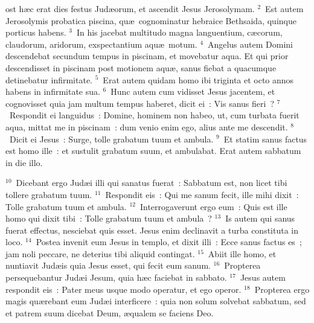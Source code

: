 \bchapter
{}ost h\ae c erat dies festus Jud\ae orum, et ascendit Jesus Jerosolymam.
${}^{2}$~Est autem Jerosolymis probatica piscina, qu\ae\ cognominatur hebraice Bethsaida, quinque porticus habens.
${}^{3}$~In his jacebat multitudo magna languentium, c\ae corum, claudorum, aridorum, exspectantium aqu\ae\ motum.
${}^{4}$~Angelus autem Domini descendebat secundum tempus in piscinam, et movebatur aqua. Et qui prior descendisset in piscinam post motionem aqu\ae , sanus fiebat a quacumque detinebatur infirmitate.
${}^{5}$~Erat autem quidam homo ibi triginta et octo annos habens in infirmitate sua.
${}^{6}$~Hunc autem cum vidisset Jesus jacentem, et cognovisset quia jam multum tempus haberet, dicit ei~: Vis sanus fieri~?
${}^{7}$~Respondit ei languidus~: Domine, hominem non habeo, ut, cum turbata fuerit aqua, mittat me in piscinam~: dum venio enim ego, alius ante me descendit.
${}^{8}$~Dicit ei Jesus~: Surge, tolle grabatum tuum et ambula.
${}^{9}$~Et statim sanus factus est homo ille~: et sustulit grabatum suum, et ambulabat. Erat autem sabbatum in die illo.


${}^{10}$~Dicebant ergo Jud\ae i illi qui sanatus fuerat~: Sabbatum est, non licet tibi tollere grabatum tuum.
${}^{11}$~Respondit eis~: Qui me sanum fecit, ille mihi dixit~: Tolle grabatum tuum et ambula.
${}^{12}$~Interrogaverunt ergo eum~: Quis est ille homo qui dixit tibi~: Tolle grabatum tuum et ambula~?
${}^{13}$~Is autem qui sanus fuerat effectus, nesciebat quis esset. Jesus enim declinavit a turba constituta in loco.
${}^{14}$~Postea invenit eum Jesus in templo, et dixit illi~: Ecce sanus factus es~; jam noli peccare, ne deterius tibi aliquid contingat.
${}^{15}$~Abiit ille homo, et nuntiavit Jud\ae is quia Jesus esset, qui fecit eum sanum.
${}^{16}$~Propterea persequebantur Jud\ae i Jesum, quia h\ae c faciebat in sabbato.
${}^{17}$~Jesus autem respondit eis~: Pater meus usque modo operatur, et ego operor.
${}^{18}$~Propterea ergo magis qu\ae rebant eum Jud\ae i interficere~: quia non solum solvebat sabbatum, sed et patrem suum dicebat Deum, \ae qualem se faciens Deo.

